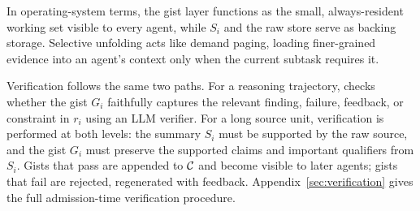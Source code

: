 In operating-system terms, the gist layer functions as the small, always-resident working set visible to every agent, while $S_i$ and the raw store serve as backing storage. Selective unfolding acts like demand paging, loading finer-grained evidence into an agent's context only when the current subtask requires it.

Verification follows the same two paths. For a reasoning trajectory, \toolName{} checks whether the gist $G_i$ faithfully captures the relevant finding, failure, feedback, or constraint in $r_i$ using an LLM verifier. For a long source unit, verification is performed at both levels: the summary $S_i$ must be supported by the raw source, and the gist $G_i$ must preserve the supported claims and important qualifiers from $S_i$. Gists that pass are appended to $\mathcal{C}$ and become visible to later agents; gists that fail are rejected, regenerated with feedback. Appendix~\ref{sec:verification} gives the full admission-time verification procedure.

